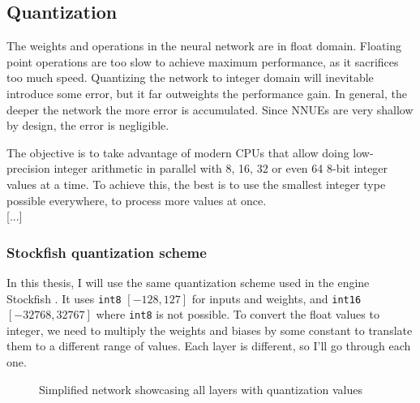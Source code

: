 \subsection{Quantization}


The weights and operations in the neural network are in float domain. Floating point operations are too slow to achieve maximum performance, as it sacrifices too much speed. Quantizing the network to integer domain will inevitable introduce some error, but it far outweights the performance gain. In general, the deeper the network the more error is accumulated. Since NNUEs are very shallow by design, the error is negligible.

The objective is to take advantage of modern CPUs that allow doing low-precision integer arithmetic in parallel with 8, 16, 32 or even 64 8-bit integer values at a time. To achieve this, the best is to use the smallest integer type possible everywhere, to process more values at once. \\

[...]

\subsubsection{Stockfish quantization scheme}

\def\int#1{\texttt{int#1}}

In this thesis, I will use the same quantization scheme used in the engine Stockfish \cite{nnue-pytorch}. It uses \int{8} $[-128, 127]$ for inputs and weights, and \int{16} $[-32768, 32767]$ where \int{8} is not possible.
To convert the float values to integer, we need to multiply the weights and biases by some constant to translate them to a different range of values. Each layer is different, so I'll go through each one.

\begin{figure}[H]
\centering
{}
\caption{Simplified network showcasing all layers with quantization values}
\label{fig:quantization}
\end{figure}

